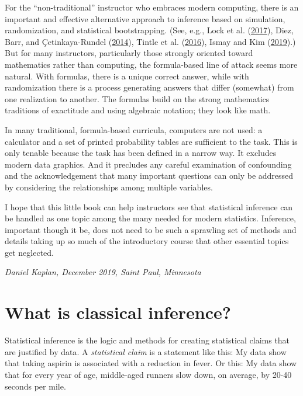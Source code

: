 \documentclass[]{tufte-book}
\begin{document}
For the ``non-traditional'' instructor who embraces modern computing, there is an important and effective alternative approach to inference based on simulation, randomization, and statistical bootstrapping. (See, e.g., Lock et al. (\protect\hyperlink{ref-lock5}{2017}), Diez, Barr, and Çetinkaya-Rundel (\protect\hyperlink{ref-ISRS}{2014}), Tintle et al. (\protect\hyperlink{ref-tintle-investigations}{2016}), Ismay and Kim (\protect\hyperlink{ref-modern-dive}{2019}).) But for many instructors, particularly those strongly oriented toward mathematics rather than computing, the formula-based line of attack seems more natural. With formulas, there is a unique correct answer, while with randomization there is a process generating answers that differ (somewhat) from one realization to another. The formulas build on the strong mathematics traditions of exactitude and using algebraic notation; they look like math.

In many traditional, formula-based curricula, computers are not used: a calculator and a set of printed probability tables are sufficient to the task. This is only tenable because the task has been defined in a narrow way. It excludes modern data graphics. And it precludes any careful examination of confounding and the acknowledgement that many important questions can only be addressed by considering the relationships among multiple variables.

I hope that this little book can help instructors see that statistical inference can be handled as one topic among the many needed for modern statistics. Inference, important though it be, does not need to be such a sprawling set of methods and details taking up so much of the introductory course that other essential topics get neglected.

\emph{Daniel Kaplan, December 2019, Saint Paul, Minnesota}

\hypertarget{what-is-classical-inference}{%
\chapter{What is classical inference?}\label{what-is-classical-inference}}

Statistical inference is the logic and methods for creating statistical claims that are justified by data. A \emph{statistical claim} is a statement like this: My data show that taking aspirin is associated with a reduction in fever. Or this: My data show that for every year of age, middle-aged runners slow down, on average, by 20-40 seconds per mile.
\end{document}
